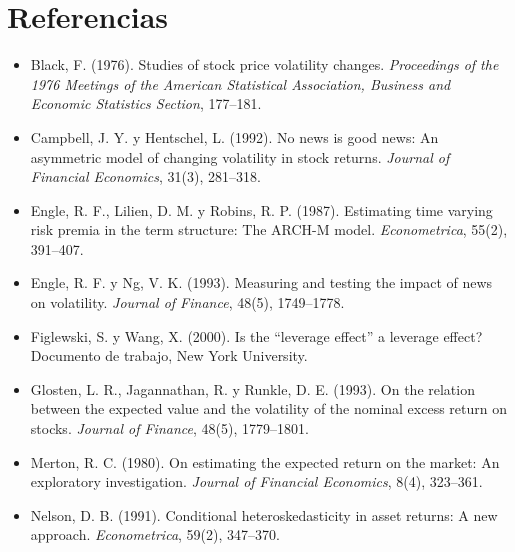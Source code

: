 \section*{Referencias}
\begin{itemize}[leftmargin=*]
  \item Black, F. (1976). Studies of stock price volatility changes. \emph{Proceedings of the 1976 Meetings of the
        American Statistical Association, Business and Economic Statistics Section}, 177--181.
  \item Campbell, J. Y. y Hentschel, L. (1992). No news is good news: An asymmetric model of changing volatility
        in stock returns. \emph{Journal of Financial Economics}, 31(3), 281--318.
  \item Engle, R. F., Lilien, D. M. y Robins, R. P. (1987). Estimating time varying risk premia in the term
        structure: The ARCH-M model. \emph{Econometrica}, 55(2), 391--407.
  \item Engle, R. F. y Ng, V. K. (1993). Measuring and testing the impact of news on volatility. \emph{Journal
        of Finance}, 48(5), 1749--1778.
  \item Figlewski, S. y Wang, X. (2000). Is the ``leverage effect'' a leverage effect? Documento de trabajo,
        New York University.
  \item Glosten, L. R., Jagannathan, R. y Runkle, D. E. (1993). On the relation between the expected value and
        the volatility of the nominal excess return on stocks. \emph{Journal of Finance}, 48(5), 1779--1801.
  \item Merton, R. C. (1980). On estimating the expected return on the market: An exploratory investigation.
        \emph{Journal of Financial Economics}, 8(4), 323--361.
  \item Nelson, D. B. (1991). Conditional heteroskedasticity in asset returns: A new approach.
        \emph{Econometrica}, 59(2), 347--370.
\end{itemize}
